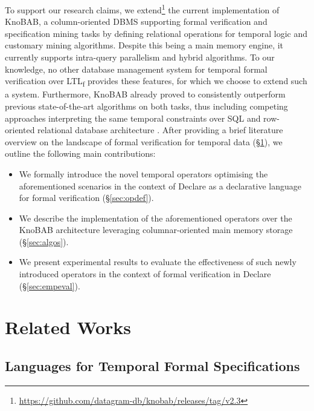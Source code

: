 \documentclass[sigconf]{acmart}
\begin{document}



To support our research claims, we extend\footnote{\url{https://github.com/datagram-db/knobab/releases/tag/v2.3}} the current implementation of KnoBAB\cite{computers12090185}, a column-oriented DBMS supporting formal verification and specification mining tasks by defining relational operations for temporal logic and customary mining algorithms. Despite this being a main memory engine, it currently supports intra-query parallelism and hybrid algorithms. To our knowledge, no other database management system for temporal formal verification over LTL\textsubscript{f} provides these features, for which we choose to extend such a system. Furthermore, KnoBAB already proved to consistently outperform previous state-of-the-art algorithms on both tasks, thus including competing approaches interpreting the same temporal constraints over SQL and row-oriented relational database architecture \cite{DBLP:conf/caise/SchonigRCJM16}. After providing a brief literature overview on the landscape of formal verification for temporal data (\S\ref{sec:relwork}), we outline the following main contributions:
\begin{itemize}
\item We formally introduce the novel temporal operators optimising the aforementioned scenarios in the context of Declare as a declarative language for formal verification (\S\ref{sec:opdef}).
\item We describe the implementation of the aforementioned operators over the KnoBAB architecture leveraging columnar-oriented main memory storage (\S\ref{sec:algos}).
\item We present experimental results to evaluate the effectiveness of such newly introduced operators in the context of formal verification in Declare (\S\ref{sec:empeval}). 
\end{itemize}


\section{Related Works}\label{sec:relwork}
\subsection{Languages for Temporal Formal Specifications}\label{ssec:languages}
\end{document}

